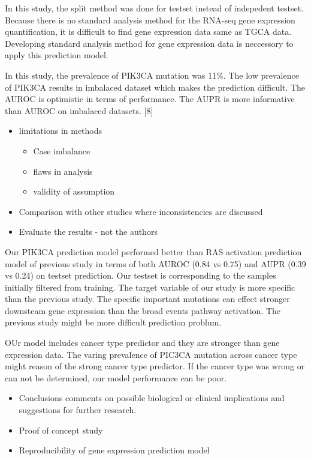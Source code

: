 \documentclass[10pt,letterpaper]{article}
\providecommand{\tightlist}{%
  \setlength{\itemsep}{0pt}\setlength{\parskip}{0pt}}
\begin{document}
In this study, the split method was done for testset instead of
indepedent testset. Because there is no standard analysis method for the
RNA-seq gene expression quantification, it is difficult to find gene
expression data same as TGCA data. Developing standard analysis method
for gene expression data is neccessory to apply this prediction model.

In this study, the prevalence of PIK3CA mutation was 11\%. The low
prevalence of PIK3CA results in imbalaced dataset which makes the
prediction difficult. The AUROC is optimistic in terms of performance.
The AUPR is more informative than AUROC on imbalaced datasets. {[}8{]}

\begin{itemize}
\item
  limitations in methods

  \begin{itemize}
  \tightlist
  \item
    Case imbalance\\
  \item
    flaws in analysis\\
  \item
    validity of assumption
  \end{itemize}
\item
  Comparison with other studies where inconsistencies are discussed\\
\item
  Evaluate the results - not the authors
\end{itemize}

Our PIK3CA prediction model performed better than RAS activation
prediction model of previous study in terms of both AUROC (0.84 vs 0.75)
and AUPR (0.39 vs 0.24) on testset prediction. Our testset is
corresponding to the samples initially filtered from training. The
target variable of our study is more specific than the previous study.
The specific important mutations can effect stronger downsteam gene
expression than the broad events pathway activation. The previous study
might be more difficult prediction problum.

OUr model includes cancer type predictor and they are stronger than gene
expression data. The varing prevalence of PIC3CA mutation across cancer
type might reason of the strong cancer type predictor. If the cancer
type was wrong or can not be determined, our model performance can be
poor.

\begin{itemize}
\item
  Conclusions comments on possible biological or clinical implications
  and suggestions for further research.
\item
  Proof of concept study\\
\item
  Reproducibility of gene expression prediction model
\end{itemize}
\end{document}
